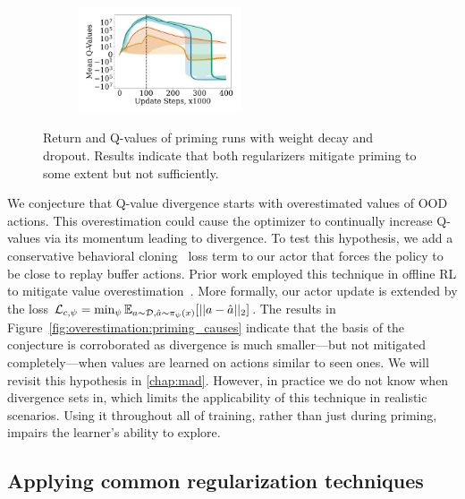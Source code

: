 \begin{figure}[t]
\begin{minipage}[b]{.62\textwidth}
\begin{subfigure}[b]{0.5\textwidth}
    \end{subfigure}%
    \begin{subfigure}[b]{0.5\textwidth}
    \centering
        \includegraphics[width=4.8cm, trim=1cm 1cm 1cm 1cm ,clip]{figures/dissecting/priming/priming_ablations_Q.pdf}
        \label{subfig:overestimation:priming_abl_Q}
    \end{subfigure}%
    \caption{Return and
    Q-values of priming runs with weight decay and dropout. Results indicate that both regularizers mitigate priming to some extent but not sufficiently. }
    \label{fig:overestimation:priming_abl}
\end{minipage}
\end{figure}


We conjecture that Q-value divergence starts with overestimated values of OOD actions. This overestimation could cause the optimizer to continually increase Q-values via its momentum leading to divergence. 
To test this hypothesis, we add a conservative behavioral cloning~\parencite{pomerleau1988alvinn, atkeson1997robot} loss term to our actor that forces the policy to be close to replay buffer actions. Prior work employed this technique in offline RL to mitigate value overestimation~\parencite{fujimoto2021td3bc}. More formally, our actor update is extended by the loss $
        \mathcal{L}_{c, \psi} = \min_{\psi} \mathbb{E}_{a \sim \mathcal{D}, \hat{a} \sim \pi_{\psi}(x)}[||a - \hat{a}||_2]$. 
The results in Figure~\ref{fig:overestimation:priming_causes} indicate that the basis of the conjecture is corroborated as divergence is much smaller---but not mitigated completely---when values are learned on actions similar to seen ones.
We will revisit this hypothesis in \autoref{chap:mad}.
However, in practice we do not know when divergence sets in, which limits the applicability of this technique in realistic scenarios. Using it throughout all of training, rather than just during priming, impairs the learner's ability to explore.




\subsection{Applying common regularization techniques} \label{sec:regularization}

